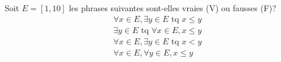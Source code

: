 Soit $E= \left[ 1 , 10\right]$ les phrases suivantes sont-elles vraies (V) ou fausses (F)?
\begin{align*}
  &\forall x \in E,  \exists y \in E \text{ tq } x\leq y \\
  &\exists y \in E \text{ tq } \forall x \in E, x\leq y  \\
  &\forall x \in E,  \exists y \in E \text{ tq } x < y \\
  &\forall x \in E,  \forall y \in E,  x\leq y \\
\end{align*}
